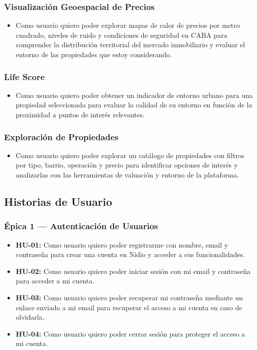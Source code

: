 \subsubsection{Visualización Geoespacial de Precios}

\begin{itemize}
\item Como usuario quiero poder explorar mapas de calor de precios por metro cuadrado, niveles de ruido y condiciones de seguridad en CABA para comprender la distribución territorial del mercado inmobiliario y evaluar el entorno de las propiedades que estoy considerando.
\end{itemize}

\subsubsection{Life Score}

\begin{itemize}
\item Como usuario quiero poder obtener un indicador de entorno urbano para una propiedad seleccionada para evaluar la calidad de su entorno en función de la proximidad a puntos de interés relevantes.
\end{itemize}

\subsubsection{Exploración de Propiedades}

\begin{itemize}
\item Como usuario quiero poder explorar un catálogo de propiedades con filtros por tipo, barrio, operación y precio para identificar opciones de interés y analizarlas con las herramientas de valuación y entorno de la plataforma.
\end{itemize}

\subsection{Historias de Usuario}

\subsubsection{Épica 1 --- Autenticación de Usuarios}

\begin{itemize}
\item \textbf{HU-01:} Como usuario quiero poder registrarme con nombre, email y contraseña para crear una cuenta en Nidio y acceder a sus funcionalidades.
\item \textbf{HU-02:} Como usuario quiero poder iniciar sesión con mi email y contraseña para acceder a mi cuenta.
\item \textbf{HU-03:} Como usuario quiero poder recuperar mi contraseña mediante un enlace enviado a mi email para recuperar el acceso a mi cuenta en caso de olvidarla.
\item \textbf{HU-04:} Como usuario quiero poder cerrar sesión para proteger el acceso a mi cuenta.
\end{itemize}

